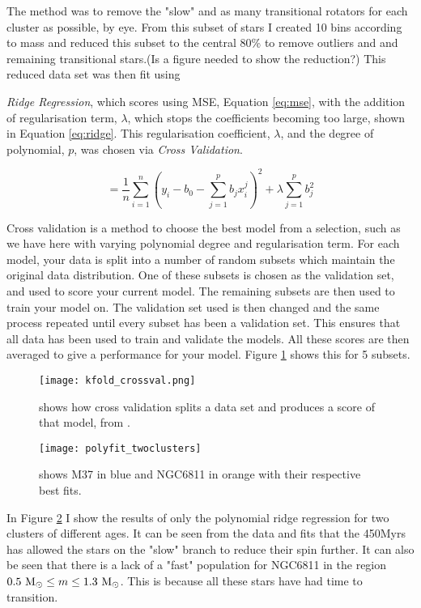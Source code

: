 \documentclass[fleqn,usenatbib]{mnras}
\begin{document}
The method was to remove the "slow" and as many transitional rotators for each cluster as possible, by eye.
From this subset of stars I created 10 bins according to mass and reduced this subset to the central 80\% to remove outliers and and remaining transitional stars.(Is a figure needed to show the reduction?)
This reduced data set was then fit using {\textit{Ridge Regression}, which scores using MSE, Equation \ref{eq:mse}, with the addition of regularisation term, $\lambda$, which stops the coefficients becoming too large, shown in Equation \ref{eq:ridge}.
This regularisation coefficient, $\lambda$, and the degree of polynomial, $p$, was chosen via \textit{Cross Validation}.

\begin{equation}
	\label{eq:ridge}
	 = \frac{1}{n}\sum_{i = 1}^n \left(y_i - b_0 - \sum_{j = 1}^p b_jx_i^j \right)^2 + \lambda \sum_{j = 1}^p b^2_j
\end{equation}

Cross validation is a method to choose the best model from a selection, such as we have here with varying polynomial degree and regularisation term.
For each model, your data is split into a number of random subsets which maintain the original data distribution.
One of these subsets is chosen as the validation set, and used to score your current model.
The remaining subsets are then used to train your model on.
The validation set used is then changed and the same process repeated until every subset has been a validation set.
This ensures that all data has been used to train and validate the models.
All these scores are then averaged to give a performance for your model.
Figure \ref{fig:cross_validation} shows this for 5 subsets.

\begin{figure}
	\texttt{[image: kfold\_crossval.png]}
	\caption{shows how cross validation splits a data set and produces a score of that model, from \protect\cite{CrossVal}.}
	\label{fig:cross_validation}
\end{figure}



\begin{figure}
	\texttt{[image: polyfit\_twoclusters]}
	\caption{shows M37 in blue and NGC6811 in orange with their respective best fits.}
	\label{fig:polyfit_twoclusters}
\end{figure}

In Figure \ref{fig:polyfit_twoclusters} I show the results of only the polynomial ridge regression for two clusters of different ages.
It can be seen from the data and fits that the 450Myrs has allowed the stars on the "slow" branch to reduce their spin further.
It can also be seen that there is a lack of a "fast" population for NGC6811 in the region $0.5~\textup{M}_\odot \leq m \leq 1.3~\textup{M}_\odot$.
This is because all these stars have had time to transition.

}
\end{document}
